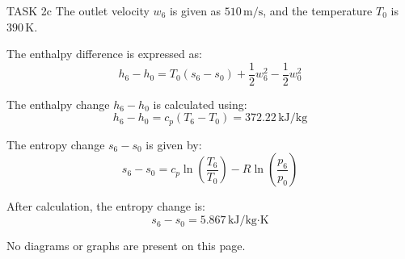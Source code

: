 TASK 2c  
The outlet velocity \( w_6 \) is given as \( 510 \, \text{m/s} \), and the temperature \( T_0 \) is \( 390 \, \text{K} \).  

The enthalpy difference is expressed as:  
\[
h_6 - h_0 = T_0 (s_6 - s_0) + \frac{1}{2} w_6^2 - \frac{1}{2} w_0^2
\]  

The enthalpy change \( h_6 - h_0 \) is calculated using:  
\[
h_6 - h_0 = c_p (T_6 - T_0) = 372.22 \, \text{kJ/kg}
\]  

The entropy change \( s_6 - s_0 \) is given by:  
\[
s_6 - s_0 = c_p \ln \left( \frac{T_6}{T_0} \right) - R \ln \left( \frac{p_6}{p_0} \right)
\]  

After calculation, the entropy change is:  
\[
s_6 - s_0 = 5.867 \, \text{kJ/kg·K}
\]  

No diagrams or graphs are present on this page.